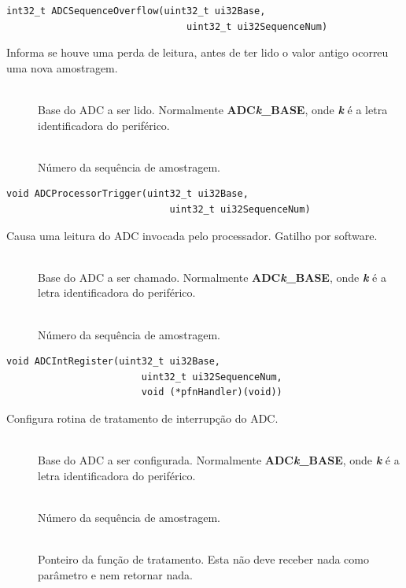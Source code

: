 \begin{lstlisting}[style=funcao]
	int32_t ADCSequenceOverflow(uint32_t ui32Base,
								uint32_t ui32SequenceNum)
\end{lstlisting}

Informa se houve uma perda de leitura, antes de ter lido o valor antigo ocorreu uma nova amostragem.

\begin{description}
	\item []\hfill \\
	Base do ADC a ser lido. Normalmente \textbf{ADC\emph{k}\_BASE}, onde \textbf{\emph{k}} é a letra identificadora do periférico.
	
	\item []\hfill \\
	Número da sequência de amostragem.
\end{description}

\begin{lstlisting}[style=funcao]
	void ADCProcessorTrigger(uint32_t ui32Base,
							 uint32_t ui32SequenceNum)
\end{lstlisting}

Causa uma leitura do ADC invocada pelo processador. Gatilho por software.

\begin{description}
	\item []\hfill \\
	Base do ADC a ser chamado. Normalmente \textbf{ADC\emph{k}\_BASE}, onde \textbf{\emph{k}} é a letra identificadora do periférico.
	
	\item []\hfill \\
	Número da sequência de amostragem.
\end{description}

\begin{lstlisting}[style=funcao]
	void ADCIntRegister(uint32_t ui32Base,
						uint32_t ui32SequenceNum,
						void (*pfnHandler)(void))
\end{lstlisting}

Configura rotina de tratamento de interrupção do ADC.

\begin{description}
	\item []\hfill \\
	Base do ADC a ser configurada. Normalmente \textbf{ADC\emph{k}\_BASE}, onde \textbf{\emph{k}} é a letra identificadora do periférico.
	
	\item []\hfill \\
	Número da sequência de amostragem.
	
	\item []\hfill \\
	Ponteiro da função de tratamento. Esta não deve receber nada como parâmetro e nem retornar nada.
	
\end{description}

